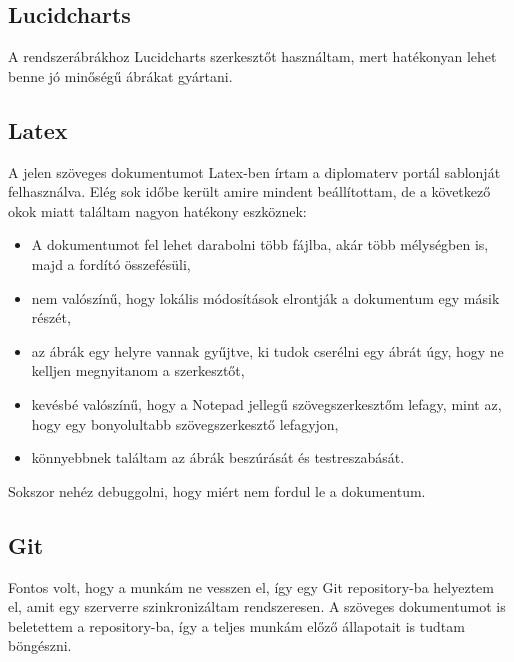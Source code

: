 \subsection{Lucidcharts}

A rendszerábrákhoz Lucidcharts szerkesztőt használtam, mert hatékonyan lehet benne jó minőségű ábrákat gyártani.

\subsection{Latex}

A jelen szöveges dokumentumot Latex-ben írtam a diplomaterv portál sablonját felhasználva. Elég sok időbe került amire mindent beállítottam, de a következő okok miatt találtam nagyon hatékony eszköznek:

\begin{itemize}
\item A dokumentumot fel lehet darabolni több fájlba, akár több mélységben is, majd a fordító összefésüli,
\item nem valószínű, hogy lokális módosítások elrontják a dokumentum egy másik részét,
\item az ábrák egy helyre vannak gyűjtve, ki tudok cserélni egy ábrát úgy, hogy ne kelljen megnyitanom a szerkesztőt,
\item kevésbé valószínű, hogy a Notepad jellegű szövegszerkesztőm lefagy, mint az, hogy egy bonyolultabb szövegszerkesztő lefagyjon,
\item könnyebbnek találtam az ábrák beszúrását és testreszabását.
\end{itemize}

Sokszor nehéz debuggolni, hogy miért nem fordul le a dokumentum.

\subsection{Git}

Fontos volt, hogy a munkám ne vesszen el, így egy Git repository-ba helyeztem el, amit egy szerverre szinkronizáltam rendszeresen. A szöveges dokumentumot is beletettem a repository-ba, így a teljes munkám előző állapotait is tudtam böngészni.



